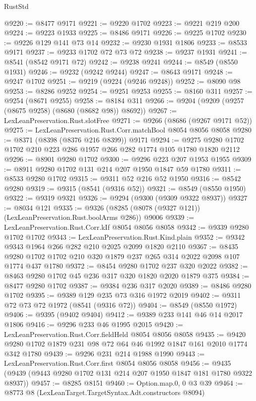\begin{lexlean}{RustStd}
\begin{coremodule}
@9220 := @8477 @9171
@9221 := @9220 @1702
@9223 := @9221 @219 @200
@9224 := @9223 @1933
@9225 := @8486 @9171
@9226 := @9225 @1702
@9230 := @9226 @129 @141 @73 @14
@9232 := @9230 @1931 @1806
@9233 := @8533 @9171
@9237 := @9233 @1702 @72 @73 @72
@9238 := @9237 @1931
@9241 := @8541 (@8542 @9171 @72)
@9242 := @9238 @9241
@9244 := @8549 (@8550 @1931)
@9246 := @9232 (@9242 @9244)
@9247 := @8643 @9171
@9248 := @9247 @1702
@9251 := @9219 (@9224 (@9246 @9248))
@9252 := @8090 @98
@9253 := @8286 @9252
@9254 := @9251 @9253
@9255 := @8160 @311
@9257 := @9254 (@8671 @9255)
@9258 := @8184 @311
@9266 := @9204 (@9209 (@9257 (@8675 @9258) (@8680 (@8682 @98)) @8692))
@9267 := LexLeanPreservation.Rust.slotFree
@9271 := @9266 (@8686 (@9267 @9171 @52))
@9275 := LexLeanPreservation.Rust.Corr.matchBool @8054 @8056 @8058
@9280 := @8371 (@8398 (@8376 @216 @8399)) @9171
@9294 := @9275 @9280 @1702 @1702 @210 @223 @286 @1957 @266 @282 @1774 @105 @1780 @1820 @2112
@9296 := @8901 @9280 @1702
@9300 := @9296 @223 @207 @1953 @1955
@9309 := @8911 @9280 @1702 @131 @214 @207 @1950 @1847 @59 @1780
@9311 := @8533 @9280 @1702
@9315 := @9311 @52 @216 @52 @1950
@9316 := @8542 @9280
@9319 := @9315 (@8541 (@9316 @52))
@9321 := @8549 (@8550 @1950)
@9322 := @9319 @9321
@9326 := @9294 (@9300 (@9309 @9322 @8937))
@9327 := @8034 @121
@9335 := @9326 (@8285 (@8078 (@9327 @121)) (LexLeanPreservation.Rust.boolArms @286)) @9006
@9339 := LexLeanPreservation.Rust.Corr.kIf @8054 @8056 @8058
@9342 := @9339 @9280 @1702 @1702
@9343 := LexLeanPreservation.Rust.Kind.plain
@9352 := @9342 @9343 @1964 @266 @282 @210 @2025 @2099 @1820 @2110
@9367 := @8435 @9280 @1702 @1702 @210 @320 @1879 @237 @265 @314 @2022 @2098 @107 @1774 @437 @1780
@9372 := @8454 @9280 @1702 @237 @320 @2022
@9382 := @8463 @9280 @1702 @45 @236 @317 @320 @1820 @2020 @1879 @375
@9384 := @8477 @9280 @1702
@9387 := @9384 @236 @317 @2020
@9389 := @8486 @9280 @1702
@9395 := @9389 @129 @235 @73 @316 @1972 @2019
@9402 := @9311 @72 @73 @72 @1972 (@8541 (@9316 @72))
@9404 := @8549 (@8550 @1972)
@9406 := @9395 (@9402 @9404)
@9412 := @9389 @233 @141 @46 @14 @2017 @1806
@9416 := @9296 @233 @46 @1995 @2015
@9420 := LexLeanPreservation.Rust.Corr.fieldHeld @8054 @8056 @8058
@9435 := @9420 @9280 @1702 @1879 @231 @98 @72 @64 @46 @1992 @1847 @161 @2010 @1774 @342 @1780
@9439 := @9296 @231 @214 @1988 @1990
@9443 := LexLeanPreservation.Rust.Corr.first @8054 @8056 @8058
@9456 := @9435 (@9439 (@9443 @9280 @1702 @131 @214 @207 @1950 @1847 @181 @1780 @9322 @8937))
@9457 := @8285 @8151
@9460 := Option.map.{0, 0} @3 @39
@9464 := @8773 @8 (LexLeanTarget.TargetSyntax.Adt.constructors @8094)

\end{coremodule}
\end{lexlean}

